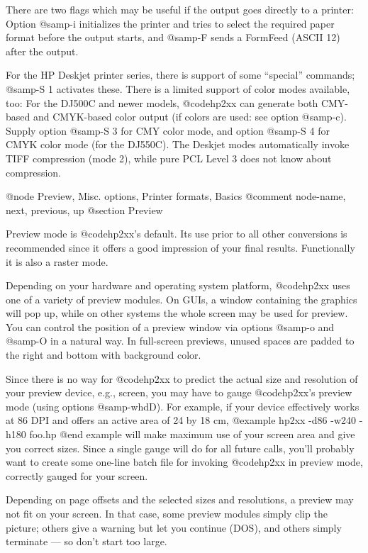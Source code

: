There are two flags which may be useful if the output goes directly
to a printer: Option @samp{-i} initializes the printer and tries to select
the required paper format before the output starts, and @samp{-F} sends a 
FormFeed (ASCII 12) after the output.

For the HP Deskjet printer series, there is support of some ``special''
commands; @samp{-S 1} activates these. There is a limited support of color
modes available, too: For the DJ500C and newer models, @code{hp2xx} can
generate both CMY-based and CMYK-based color output (if colors are used:
see option @samp{-c}). Supply option @samp{-S 3} for CMY color mode, and
option @samp{-S 4} for CMYK color mode (for the DJ550C). The Deskjet modes
automatically invoke TIFF compression (mode 2), while pure PCL Level 3
does not know about compression.



@node Preview, Misc. options, Printer formats, Basics
@comment  node-name,  next,  previous,  up
@section Preview

Preview mode is @code{hp2xx}'s default. Its use prior to all other
conversions is recommended since it offers a good impression of your
final results. Functionally it is also a raster mode.

Depending on your hardware and operating system platform,
@code{hp2xx} uses one of a variety of preview modules.
On GUIs, a window containing the graphics will pop up, while on other
systems the whole screen may be used for preview. You can control the
position of a preview window via options @samp{-o} and @samp{-O} in
a natural way. In full-screen previews, unused spaces are padded to the
right and bottom with background color.

Since there is no way for @code{hp2xx} to predict the actual size and
resolution of your preview device, e.g., screen, you may have to
gauge @code{hp2xx}'s preview mode (using options @samp{-whdD}). For example,
if your device effectively works at 86 DPI and offers an active area of
24 by 18 cm,
@example
hp2xx -d86 -w240 -h180 foo.hp
@end example
will make maximum use of your screen area and give you correct sizes.
Since a single gauge will do for all future calls, you'll probably want
to create some one-line batch file for invoking @code{hp2xx} in preview
mode, correctly gauged for your screen.


Depending on page offsets and the selected sizes and resolutions, a preview
may not fit on your screen. In that case, some preview modules simply
clip the picture; others give a warning but let you continue (DOS),
and others simply terminate --- so don't start too large.

